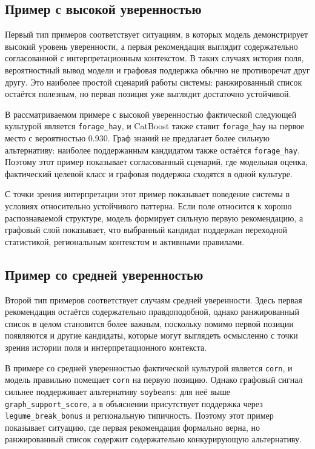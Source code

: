 

\subsection{Пример с высокой уверенностью}

Первый тип примеров соответствует ситуациям, в которых модель демонстрирует высокий уровень уверенности, а первая
рекомендация выглядит содержательно согласованной с интерпретационным контекстом. В таких случаях история поля,
вероятностный вывод модели и графовая поддержка обычно не противоречат друг другу. Это наиболее простой сценарий работы
системы: ранжированный список остаётся полезным, но первая позиция уже выглядит достаточно устойчивой.

В рассматриваемом примере с высокой уверенностью фактической следующей культурой является \texttt{forage\_hay}, и
CatBoost также ставит \texttt{forage\_hay} на первое место с вероятностью 0.930. Граф знаний не предлагает более
сильную альтернативу: наиболее поддержанным кандидатом также остаётся \texttt{forage\_hay}. Поэтому этот пример
показывает согласованный сценарий, где модельная оценка, фактический целевой класс и графовая поддержка сходятся в одной
культуре.

С точки зрения интерпретации этот пример показывает поведение системы в условиях
относительно устойчивого паттерна. Если поле относится к хорошо распознаваемой структуре, модель формирует сильную
первую рекомендацию, а графовый слой показывает, что выбранный кандидат поддержан переходной статистикой,
региональным контекстом и активными правилами.

\subsection{Пример со средней уверенностью}

Второй тип примеров соответствует случаям средней уверенности. Здесь первая рекомендация остаётся содержательно
правдоподобной, однако ранжированный список в целом становится более важным, поскольку помимо первой позиции появляются и
другие кандидаты, которые могут выглядеть осмысленно с точки зрения истории поля и интерпретационного контекста.

В примере со средней уверенностью фактической культурой является \texttt{corn}, и модель правильно помещает
\texttt{corn} на первую позицию. Однако графовый сигнал сильнее поддерживает альтернативу \texttt{soybeans}: для неё
выше \texttt{graph\_support\_score}, а в объяснении присутствует поддержка через \texttt{legume\_break\_bonus} и
региональную типичность. Поэтому этот пример показывает ситуацию, где первая рекомендация формально верна, но
ранжированный список содержит содержательно конкурирующую альтернативу.

